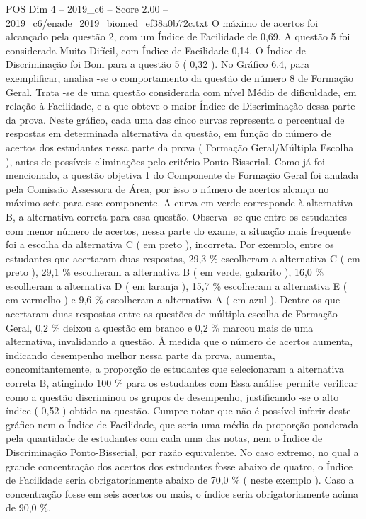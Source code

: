 \begin{textsample}{POS Dim 4 – 2019\_c6 – Score 2.00 – 2019\_c6/enade\_2019\_biomed\_ef38a0b72c.txt}
O máximo de acertos foi alcançado pela questão 2, com um Índice de Facilidade de 0,69.
A questão 5 foi considerada Muito Difícil, com Índice de Facilidade 0,14.
O Índice de Discriminação foi Bom para a questão 5 ( 0,32 ).
No Gráfico 6.4, para exemplificar, analisa -se o comportamento da questão de número 8 de Formação Geral.
Trata -se de uma questão considerada com nível Médio de dificuldade, em relação à Facilidade, e a que obteve o maior Índice de Discriminação dessa parte da prova.
Neste gráfico, cada uma das cinco curvas representa o percentual de respostas em determinada alternativa da questão, em função do número de acertos dos estudantes nessa parte da prova ( Formação Geral/Múltipla Escolha ), antes de possíveis eliminações pelo critério Ponto-Bisserial.
Como já foi mencionado, a questão objetiva 1 do Componente de Formação Geral foi anulada pela Comissão Assessora de Área, por isso o número de acertos alcança no máximo sete para esse componente.
A curva em verde corresponde à alternativa B, a alternativa correta para essa questão.
Observa -se que entre os estudantes com menor número de acertos, nessa parte do exame, a situação mais frequente foi a escolha da alternativa C ( em preto ), incorreta.
Por exemplo, entre os estudantes que acertaram duas respostas, 29,3 \% escolheram a alternativa C ( em preto ), 29,1 \% escolheram a alternativa B ( em verde, gabarito ), 16,0 \% escolheram a alternativa D ( em laranja ), 15,7 \% escolheram a alternativa E ( em vermelho ) e 9,6 \% escolheram a alternativa A ( em azul ).
Dentre os que acertaram duas respostas entre as questões de múltipla escolha de Formação Geral, 0,2 \% deixou a questão em branco e 0,2 \% marcou mais de uma alternativa, invalidando a questão.
À medida que o número de acertos aumenta, indicando desempenho melhor nessa parte da prova, aumenta, concomitantemente, a proporção de estudantes que selecionaram a alternativa correta B, atingindo 100 \% para os estudantes com Essa análise permite verificar como a questão discriminou os grupos de desempenho, justificando -se o alto índice ( 0,52 ) obtido na questão.
Cumpre notar que não é possível inferir deste gráfico nem o Índice de Facilidade, que seria uma média da proporção ponderada pela quantidade de estudantes com cada uma das notas, nem o Índice de Discriminação Ponto-Bisserial, por razão equivalente.
No caso extremo, no qual a grande concentração dos acertos dos estudantes fosse abaixo de quatro, o Índice de Facilidade seria obrigatoriamente abaixo de 70,0 \% ( neste exemplo ).
Caso a concentração fosse em seis acertos ou mais, o índice seria obrigatoriamente acima de 90,0 \%.

\end{textsample}

